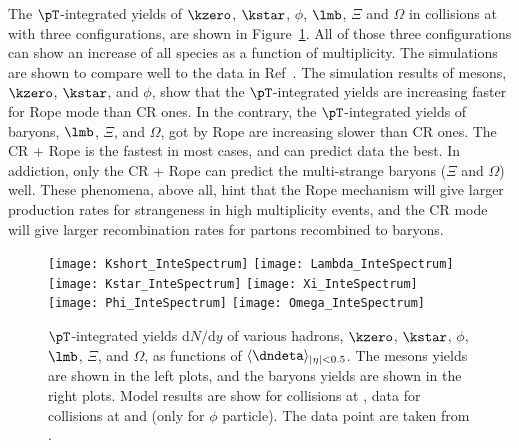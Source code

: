 \documentclass[ALICE,manyauthors]{StrinJet}
\begin{document}
The $\pT$-integrated yields of $\kzero$, $\kstar$, $\phi$, $\lmb$, $\Xi$ and $\Omega$ in \pp collisions at \seven with three configurations, are shown in Figure~\ref{fig:InclIntePar}. All of those three configurations can show an increase of all species as a function of multiplicity. The simulations are shown to compare well to the  data in Ref~\cite{ALICE:2016fzo, ALICE:2019etb}. The simulation results of  mesons, $\kzero$, $\kstar$, and $\phi$, show that the $\pT$-integrated yields are increasing faster for Rope mode than CR ones. In the contrary, the $\pT$-integrated yields of baryons, $\lmb$, $\Xi$, and $\Omega$, got by Rope are increasing slower than CR ones. The CR + Rope is the fastest in most cases, and can predict data the best. In addiction, only the CR + Rope can predict the multi-strange baryons ($\Xi$ and $\Omega$) well. These phenomena, above all, hint that the Rope mechanism will give larger production rates for strangeness in high multiplicity events, and the CR mode will give larger recombination rates for partons recombined to baryons.
\begin{figure}[ht]
	\begin{center}
		\texttt{[image: Kshort\_InteSpectrum]}
		\texttt{[image: Lambda\_InteSpectrum]}
		\texttt{[image: Kstar\_InteSpectrum]}
		\texttt{[image: Xi\_InteSpectrum]}
		\texttt{[image: Phi\_InteSpectrum]}
		\texttt{[image: Omega\_InteSpectrum]}
	\end{center}
	\caption{$\pT$-integrated yields d$N/$d$y$ of various hadrons, $\kzero$, $\kstar$, $\phi$, $\lmb$, $\Xi$, and $\Omega$, as functions of $\langle\dndeta\rangle_{|\eta| < 0.5}$. The mesons yields are shown in the left plots, and the baryons yields are shown in the right plots. Model results are show for \pp collisions at \seven, data for \pp collisions at \seven and \thirteen (only for $\phi$ particle). The data point are taken from \cite{ALICE:2016fzo, ALICE:2019etb}.}
	\label{fig:InclIntePar}
\end{figure}
\end{document}
